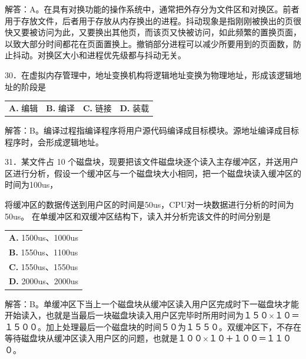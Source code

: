 \documentclass[UTF8,11pt]{ctexart}
\begin{document}
解答：A。在具有对换功能的操作系统中，通常把外存分为文件区和对换区。前者用于存放文件，后者用于存放从内存换出的进程。抖动现象是指刚刚被换出的页很快又要被访问为此，又要换出其他页，而该页又快被访问，如此频繁的置换页面，以致大部分时间都花在页面置换上。撤销部分进程可以减少所要用到的页面数，防止抖动。对换区大小和进程优先级都与抖动无关。


30．在虚拟内存管理中，地址变换机构将逻辑地址变换为物理地址，形成该逻辑地址的阶段是


\begin{center}\begin{tabular}{>{\raggedright\arraybackslash}p{\dimexpr(\linewidth-8\tabcolsep)/4\relax}>{\raggedright\arraybackslash}p{\dimexpr(\linewidth-8\tabcolsep)/4\relax}>{\raggedright\arraybackslash}p{\dimexpr(\linewidth-8\tabcolsep)/4\relax}>{\raggedright\arraybackslash}p{\dimexpr(\linewidth-8\tabcolsep)/4\relax}}
\textbf{A.} 编辑 & \textbf{B.} 编译 & \textbf{C.} 链接 & \textbf{D.} 装载\\[.35em]\end{tabular}\end{center}

解答：B。编译过程指编译程序将用户源代码编译成目标模块。源地址编译成目标程序时，会形成逻辑地址。


31．某文件占 10 个磁盘块，现要把该文件磁盘块逐个读入主存缓冲区，并送用户区进行分析，假设一个缓冲区与一个磁盘块大小相同，把一个磁盘块读入缓冲区的时间为100us，


将缓冲区的数据传送到用户区的时间是50us，CPU对一块数据进行分析的时间为50us。 在单缓冲区和双缓冲区结构下，读入并分析完该文件的时间分别是


\begin{center}\begin{tabular}{>{\raggedright\arraybackslash}p{\dimexpr(\linewidth-2\tabcolsep)/1\relax}}
\textbf{A.} 1500us、1000us\\[.35em]
\textbf{B.} 1550us、1100us\\[.35em]
\textbf{C.} 1550us、1550us\\[.35em]
\textbf{D.} 2000us、2000us\\[.35em]\end{tabular}\end{center}

解答：B。单缓冲区下当上一个磁盘块从缓冲区读入用户区完成时下一磁盘块才能开始读入，也就是当最后一块磁盘块读入用户区完毕时所用时间为１５０×１０＝１５００。加上处理最后一个磁盘块的时间５０为１５５０。双缓冲区下，不存在等待磁盘块从缓冲区读入用户区的问题，也就是１００×１０＋１００＝１１００。
\end{document}
